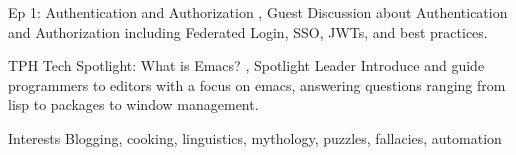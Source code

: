 

\begin{cventries}


  \cventrynoposition
    {Ep 1: Authentication and Authorization} %
    {, Guest}
    {}
    {Discussion about Authentication and Authorization including Federated Login, SSO, JWTs, and best practices.}

\cventrynoposition
    {TPH Tech Spotlight: What is Emacs?} %
    {, Spotlight Leader}
    {}
    {Introduce and guide programmers to editors with a focus on emacs, answering questions ranging from lisp to packages to window management.}

\cventrynoposition
    {Interests} %
    {}
    {}
    {Blogging, cooking, linguistics, mythology, puzzles, fallacies, automation}


\end{cventries}
